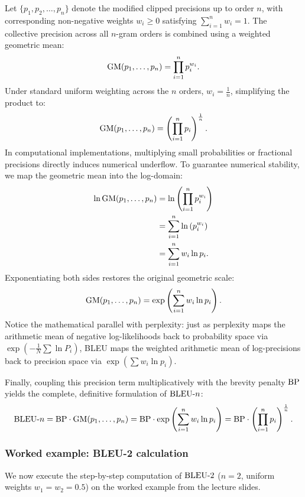 \documentclass[../../../main.tex]{subfiles}
\begin{document}
Let $\{p_1, p_2, \dots, p_n\}$ denote the modified clipped precisions up to order $n$, with corresponding non-negative weights $w_i \ge 0$ satisfying $\sum_{i=1}^n w_i = 1$. The collective precision across all $n$-gram orders is combined using a weighted geometric mean:
\begin{equation}
\label{eq:bleu_geom_mean_raw}
\mathrm{GM}(p_1, \dots, p_n) = \prod_{i=1}^n p_i^{w_i}.
\end{equation}
Under standard uniform weighting across the $n$ orders, $w_i = \frac{1}{n}$, simplifying the product to:
\begin{equation}
\mathrm{GM}(p_1, \dots, p_n) = \left( \prod_{i=1}^n p_i \right)^{\frac{1}{n}}.
\end{equation}
In computational implementations, multiplying small probabilities or fractional precisions directly induces numerical underflow. To guarantee numerical stability, we map the geometric mean into the log-domain:
\begin{align}
\ln \mathrm{GM}(p_1, \dots, p_n) &= \ln\left( \prod_{i=1}^n p_i^{w_i} \right) \nonumber \\
                          &= \sum_{i=1}^n \ln\left( p_i^{w_i} \right) \nonumber \\
                          &= \sum_{i=1}^n w_i \ln p_i.
\end{align}
Exponentiating both sides restores the original geometric scale:
\begin{equation}
\label{eq:bleu_exp_log_sum}
\mathrm{GM}(p_1, \dots, p_n) = \exp\left( \sum_{i=1}^n w_i \ln p_i \right).
\end{equation}
Notice the mathematical parallel with perplexity: just as perplexity maps the arithmetic mean of negative log-likelihoods back to probability space via $\exp(-\frac{1}{N}\sum \ln P_i)$, BLEU maps the weighted arithmetic mean of log-precisions back to precision space via $\exp(\sum w_i \ln p_i)$.

Finally, coupling this precision term multiplicatively with the brevity penalty $\mathrm{BP}$ yields the complete, definitive formulation of $\mathrm{BLEU}\text{-}n$:
\begin{equation}
\label{eq:bleu_full_formula}
\mathrm{BLEU}\text{-}n = \mathrm{BP} \cdot \mathrm{GM}(p_1, \dots, p_n) = \mathrm{BP} \cdot \exp\left( \sum_{i=1}^n w_i \ln p_i \right) = \mathrm{BP} \cdot \left( \prod_{i=1}^n p_i \right)^{\frac{1}{n}}.
\end{equation}

\subsubsection{Worked example: BLEU-2 calculation}
We now execute the step-by-step computation of $\mathrm{BLEU}\text{-}2$ ($n=2$, uniform weights $w_1 = w_2 = 0.5$) on the worked example from the lecture slides.
\end{document}
